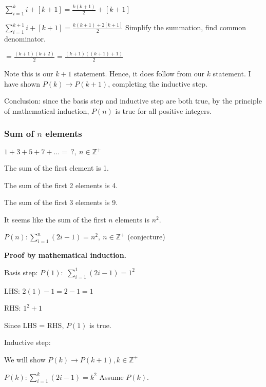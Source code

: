 \documentclass[english,openany]{book}
\begin{document}
    \noindent{}

    $\sum_{i=1}^{k} i + [k+1] = \frac{k(k+1)}{2} + [k+1]$

    $\sum_{i=1}^{k+1} i + [k+1] = \frac{k(k+1)+2[k+1]}{2}$ Simplify the summation, find common denominator.

    \qquad \qquad$= \frac{(k+1)(k+2)}{2} = \frac{(k+1)((k+1)+1)}{2}$

    Note this is our $k+1$ statement. Hence, it does follow from our $k$ statement. I have shown $P(k) \rightarrow P(k+1)$, completing the inductive step.

    Conclusion: since the basis step and inductive step are both true, by the principle of mathematical induction, $P(n)$ is true for all positive integers.\\

    \subsubsection{Sum of $n$ elements}

    $1+3+5+7+\dots =\ ?,\ n \in \mathbb Z^+$

    The sum of the first element is 1.

    The sum of the first 2 elements is 4.

    The sum of the first 3 elements is 9.

    It seems like the sum of the first $n$ elements is $n^2$.

    $P(n): \sum_{i=1}^{n} (2i-1) = n^2,\ n \in \mathbb Z^+$ (conjecture)

    \textbf{Proof by mathematical induction.}

    Basis step: $P(1):$ $\sum_{i=1}^{1} (2i-1) = 1^2$

    LHS: $2(1) - 1 = 2-1 = 1$

    RHS: $1^2 + 1$

    Since LHS = RHS, $P(1)$ is true.

    Inductive step:

    We will show $P(k) \rightarrow P(k+1), k \in \mathbb Z^+$

    $P(k): \sum_{i=1}^{k} (2i-1) = k^2$ Assume $P(k)$.
\end{document}
